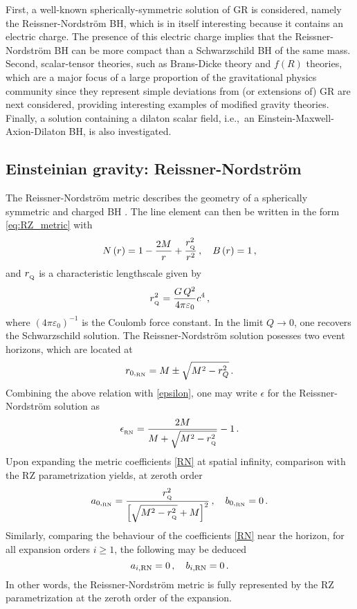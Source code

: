 \documentclass[a4paper,aps,twocolumn,showpacs,showkeys,nofootinbib,preprintnumbers,superscriptaddress,amsmath,amssymb,amsfonts]{revtex4-1}
\newcommand{\ie}{{i.e.,}~}
\begin{document}
First, a well-known spherically-symmetric solution of
GR is considered, namely the Reissner-Nordstr\"{o}m BH, which is in itself
interesting because it contains an electric charge. The presence of this
electric charge implies that the Reissner-Nordstr\"om BH can be more
compact than a Schwarzschild BH of the same mass.
Second, scalar-tensor theories, such as Brans-Dicke theory
and $f(R)$ theories, which are a major focus of a large proportion of the
gravitational physics community since they represent simple deviations
from (or extensions of) GR are next considered, providing interesting examples of
modified gravity theories.
Finally, a solution containing a dilaton scalar field, \ie an
Einstein-Maxwell-Axion-Dilaton BH, is also investigated.


\subsection{Einsteinian gravity: Reissner-Nordstr\"{o}m}
\label{tre.uno}
The Reissner-Nordstr\"{o}m metric describes the geometry
of a spherically symmetric and charged BH
\cite{Chandrasekhar83}. The line element can then be written
in the form \eqref{eq:RZ_metric} with
\begin{equation}
\label{RN}
N\left(r\right) = 1-\frac{2M}{r}+\frac{r_{_{\rm Q}}^2}{r^2} \,, \quad
B\left(r\right) = 1 \,,
\end{equation}
and $r_{_{\rm Q}}$ is a characteristic lengthscale given by
\begin{eqnarray}
r_{_{\rm Q}}^2=\frac{G\,Q^2}{4\pi \varepsilon_0} c^4 \,,
\end{eqnarray}
where $\left(4\pi \varepsilon_0\right)^{-1}$ is the Coulomb force constant.
In the limit $Q\rightarrow 0$, one recovers the Schwarzschild
solution. The Reissner-Nordstr\"{o}m solution posesses two event
horizons, which are located at
%
\begin{eqnarray}
r_{0,_{\rm RN}} = M\pm\sqrt{M^2-r^2_Q} \,.
\end{eqnarray}
%
Combining the above relation with \eqref{epsilon}, one may write $\epsilon$ for 
the Reissner-Nordstr\"{o}m solution as
\begin{eqnarray}
\epsilon_{_{\rm RN}} = \frac{2 M}{M+\sqrt{M^2-r_{_{\rm Q}}^2}}-1 \,. 
\end{eqnarray}
Upon expanding the metric coefficients \eqref{RN} at spatial infinity,
comparison with the RZ parametrization yields, at zeroth order
%
\begin{equation}
\label{a0RN}
a_{0,_{\rm RN}} = \frac{r_{_{\rm Q}}^2}{\left[\sqrt{M^2-r_{_{\rm Q}}^2}+M\right]^2} \,, \quad
b_{0,_{\rm RN}} = 0 \,.
\end{equation}
%
Similarly, comparing the behaviour of the coefficients \eqref{RN} near the horizon,
for all expansion orders $i\ge 1$, the following may be deduced
%
\begin{equation}
a_{i,{\rm RN}} = 0 \,, \quad b_{i,{\rm RN}} = 0 \,.
\end{equation}
%
In other words, the Reissner-Nordstr\"{o}m metric is fully represented by
the RZ parametrization at the zeroth order of the expansion. 
\end{document}
